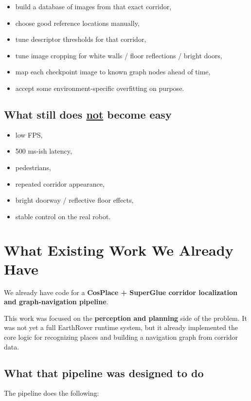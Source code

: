 \documentclass[11pt,a4paper]{article}
\begin{document}
\begin{itemize}[nosep]
  \item build a database of images from that exact corridor,
  \item choose good reference locations manually,
  \item tune descriptor thresholds for that corridor,
  \item tune image cropping for white walls / floor reflections / bright doors,
  \item map each checkpoint image to known graph nodes ahead of time,
  \item accept some environment-specific overfitting on purpose.
\end{itemize}

\subsection*{What still does \underline{not} become easy}

\begin{itemize}[nosep]
  \item low FPS,
  \item 500 ms-ish latency,
  \item pedestrians,
  \item repeated corridor appearance,
  \item bright doorway / reflective floor effects,
  \item stable control on the real robot.
\end{itemize}


\section{What Existing Work We Already Have}

We already have code for a \textbf{CosPlace + SuperGlue corridor localization and graph-navigation pipeline}.

This work was focused on the \textbf{perception and planning} side of the problem.
It was not yet a full EarthRover runtime system, but it already implemented the
core logic for recognizing places and building a navigation graph from corridor data.

\subsection*{What that pipeline was designed to do}

The pipeline does the following:
\end{document}
